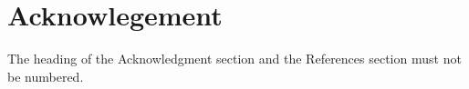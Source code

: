 \documentclass{siintec}
\begin{document}
\section*{Acknowlegement}
The heading of the Acknowledgment section and the References section must not be numbered.




\end{document}

